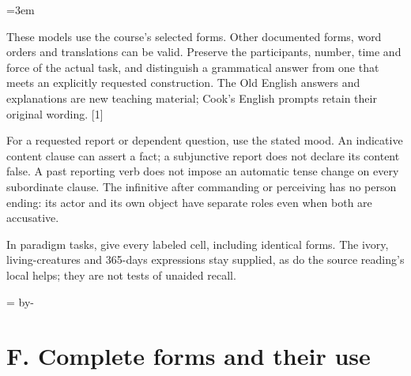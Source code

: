 \BookRecto
\begingroup
\renewcommand{\runningtitle}{Unit 9. Answer key}
\emergencystretch=3em
\newcommand{\itempara}[2]{\par\addvspace{3pt}\noindent\hangindent=1.8em\hangafter=1\makebox[1.8em][l]{#1.}#2\par}
\newcommand{\reserve}[1]{\par\penalty-100\begingroup\dimen0=\pagegoal\advance\dimen0 by-\pagetotal\ifdim\dimen0<#1\newpage\fi\endgroup}

\raggedright
{}

These models use the course's selected forms. Other documented forms, word orders and translations can be valid. Preserve the participants, number, time and force of the actual task, and distinguish a grammatical answer from one that meets an explicitly requested construction. The Old English answers and explanations are new teaching material; Cook's English prompts retain their original wording. [1]

For a requested report or dependent question, use the stated mood. An indicative content clause can assert a fact; a subjunctive report does not declare its content false. A past reporting verb does not impose an automatic tense change on every subordinate clause. The infinitive after commanding or perceiving has no person ending: its actor and its own object have separate roles even when both are accusative.

In paradigm tasks, give every labeled cell, including identical forms. The ivory, living-creatures and 365-days expressions stay supplied, as do the source reading's local helps; they are not tests of unaided recall.

\reserve{7\baselineskip}
\section*{F. Complete forms and their use}

